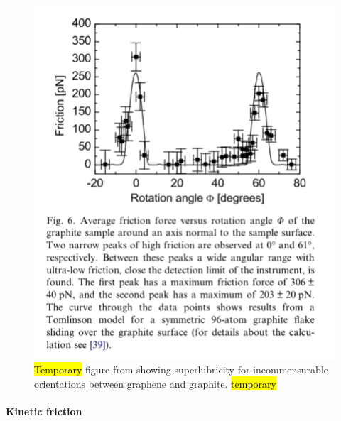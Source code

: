 \begin{figure}[H]
  \centering
  \includegraphics[width=0.5\linewidth]{figures/theory/graphene_rot.png}
  \caption{\hl{Temporary} figure from \cite{DIENWIEBEL2005197} showing superlubricity for incommensurable orientations between graphene and graphite. \hl{temporary}}
  \label{fig:graphene_rot}
\end{figure}



\paragraph*{Kinetic friction}





